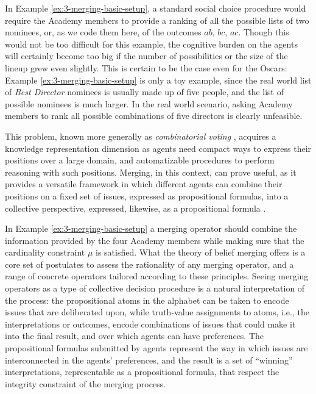 In Example \ref{ex:3-merging-basic-setup},
a standard social choice procedure would require
the Academy members to provide a ranking 
of all the possible lists of two nominees, 
or, as we code them here, of the outcomes 
$ab$, $bc$, $ac$.
Though this would not be too difficult for this example,
the cognitive burden on the agents will certainly become too big
if the number of possibilities or the size of the lineup 
grew even slightly. 
This is certain to be the case even for the Oscars:
Example \ref{ex:3-merging-basic-setup} is only a toy example,
since the real world list of \emph{Best Director} nominees is 
usually made up of five people, and the list of possible 
nominees is much larger. 
In the real world scenario, asking Academy members to rank all possible
combinations of five directors is clearly unfeasible.

This problem, known more generally as \emph{combinatorial voting} \cite{LangX16}, 
acquires a knowledge representation dimension 
as agents need compact ways to express their positions over 
a large domain, and automatizable procedures 
to perform reasoning with such positions.
Merging, in this context, can prove useful,
as it provides a versatile framework in which different agents 
can combine their positions on a fixed set of issues,
expressed as propositional formulas,
into a collective perspective, expressed, likewise,
as a propositional formula \cite{KoniecznyP02,KoniecznyP11}.

In Example \ref{ex:3-merging-basic-setup}
a merging operator should combine the information 
provided by the four Academy members
while making sure that the cardinality constraint $\mu$ is satisfied.
What the theory of belief merging offers is
a core set of postulates to assess the rationality of any merging operator,
and a range of concrete operators tailored according to these principles.
Seeing merging operators as a type of collective decision procedure
is a natural interpretation of the process:
the propositional atoms in the alphabet can be taken 
to encode issues that are deliberated upon,
while truth-value assignments to atoms, 
i.e., the interpretations or outcomes, 
encode combinations of issues that could make it 
into the final result, and over which agents can have preferences.
The propositional formulas submitted by agents 
represent the way in which issues are interconnected in the agents' preferences,
and the result is a set of ``winning'' interpretations,
representable as a propositional formula, 
that respect the integrity constraint of the merging process. 

